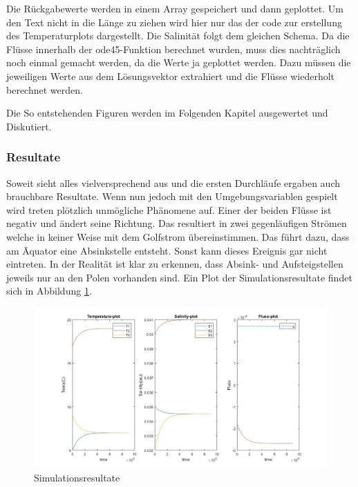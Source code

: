 

Die Rückgabewerte werden in einem Array gespeichert und dann geplottet. Um den Text nicht in die Länge zu ziehen wird hier nur das der code zur erstellung des Temperaturplots dargestellt. Die Salinität folgt dem gleichen Schema.
Da die Flüsse innerhalb der ode45-Funktion berechnet wurden, muss dies nachträglich noch einmal gemacht werden, da die Werte ja geplottet werden. Dazu müssen die jeweiligen Werte aus dem Lösungsvektor extrahiert und die Flüsse wiederholt berechnet werden.


Die So entstehenden Figuren werden im Folgenden Kapitel ausgewertet und Diskutiert. 

\subsubsection{Resultate}


Soweit sieht alles vielversprechend aus und die ersten Durchläufe ergaben auch brauchbare Resultate. Wenn nun jedoch mit den Umgebungsvariablen gespielt wird treten plötzlich unmögliche Phänomene auf.
Einer der beiden Flüsse ist negativ und ändert seine Richtung. Das resultiert in zwei gegenläufigen Strömen welche in keiner Weise mit dem Golfstrom übereinstimmen. Das führt dazu, dass am Äquator eine Absinkstelle entsteht. Sonst kann dieses Ereignis gar nicht eintreten. In der Realität ist klar zu erkennen, dass Absink- und Aufsteigstellen jeweils nur an den Polen vorhanden sind. 
Ein Plot der Simulationsresultate findet sich in Abbildung \ref{thermohalin:simulationsresultate}.

\begin{figure}
	\includegraphics[width=14cm]{thermohalin/Code/graphs/result-3b2f-script.jpg}
	\centering
	\caption{Simulationsresultate}
	\label{thermohalin:simulationsresultate}
\end{figure}


